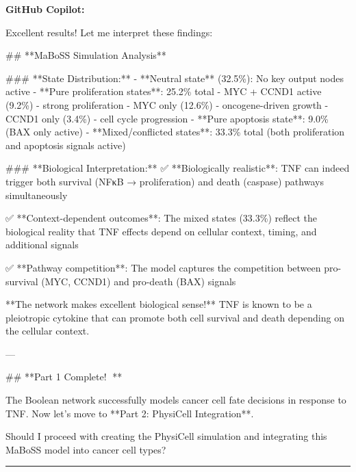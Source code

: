 \documentclass[11pt,a4paper]{article}
\begin{document}
\begin{copilotbox}
\textbf{GitHub Copilot:}

Excellent results! Let me interpret these findings:

\#\# **MaBoSS Simulation Analysis**

\#\#\# **State Distribution:**
- **Neutral state** (32.5\%): No key output nodes active
- **Pure proliferation states**: 25.2\% total
  - MYC + CCND1 active (9.2\%) - strong proliferation  
  - MYC only (12.6\%) - oncogene-driven growth
  - CCND1 only (3.4\%) - cell cycle progression
- **Pure apoptosis state**: 9.0\% (BAX only active)
- **Mixed/conflicted states**: 33.3\% total (both proliferation and apoptosis signals active)

\#\#\# **Biological Interpretation:**
✅ **Biologically realistic**: TNF can indeed trigger both survival (NFκB → proliferation) and death (caspase) pathways simultaneously

✅ **Context-dependent outcomes**: The mixed states (33.3\%) reflect the biological reality that TNF effects depend on cellular context, timing, and additional signals

✅ **Pathway competition**: The model captures the competition between pro-survival (MYC, CCND1) and pro-death (BAX) signals

**The network makes excellent biological sense!** TNF is known to be a pleiotropic cytokine that can promote both cell survival and death depending on the cellular context.

---

\#\# **Part 1 Complete! 🎉**

The Boolean network successfully models cancer cell fate decisions in response to TNF. Now let's move to **Part 2: PhysiCell Integration**.

Should I proceed with creating the PhysiCell simulation and integrating this MaBoSS model into cancer cell types?

\end{copilotbox}
\bigskip\hrule\bigskip
\end{document}
